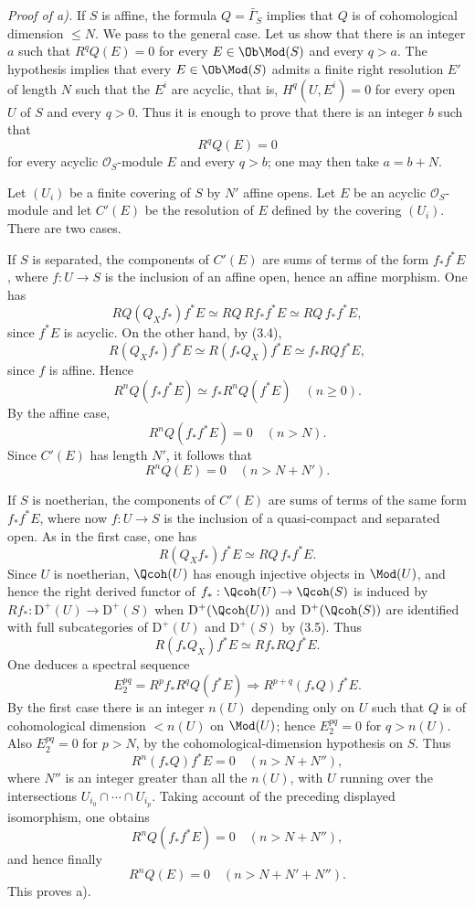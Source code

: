 \emph{Proof of a).} If $S$ is affine, the formula $Q=\widetilde{\Gamma_S}$ implies that $Q$ is of cohomological dimension $\leq N$. We pass to the general case. Let us show that there is an integer $a$ such that $R^qQ(E)=0$ for every $E\in\Ob\Mod(S)$ and every $q>a$. The hypothesis implies that every $E\in\Ob\Mod(S)$ admits a finite right resolution $E'$ of length $N$ such that the $E^i$ are acyclic, that is, $H^q(U,E^i)=0$ for every open $U$ of $S$ and every $q>0$. Thus it is enough to prove that there is an integer $b$ such that
\[
 R^qQ(E)=0
\]
for every acyclic $\mathcal O_S$-module $E$ and every $q>b$; one may then take $a=b+N$.

Let $(U_i)$ be a finite covering of $S$ by $N'$ affine opens. Let $E$ be an acyclic $\mathcal O_S$-module and let $C'(E)$ be the resolution of $E$ defined by the covering $(U_i)$. There are two cases.

If $S$ is separated, the components of $C'(E)$ are sums of terms of the form $f_*f^*E$, where $f:U\to S$ is the inclusion of an affine open, hence an affine morphism. One has
\[
 RQ(Q_Xf_*)f^*E\simeq RQ\,Rf_*f^*E\simeq RQ\,f_*f^*E,
\]
since $f^*E$ is acyclic. On the other hand, by (3.4),
\[
 R(Q_Xf_*)f^*E\simeq R(f_*Q_X)f^*E\simeq f_*RQf^*E,
\]
since $f$ is affine. Hence
\[
 R^nQ(f_*f^*E)\simeq f_*R^nQ(f^*E)\quad(n\geq0).
\]
By the affine case,
\[
 R^nQ(f_*f^*E)=0\quad(n>N).
\]
Since $C'(E)$ has length $N'$, it follows that
\[
 R^nQ(E)=0\quad(n>N+N').
\]

If $S$ is noetherian, the components of $C'(E)$ are sums of terms of the same form $f_*f^*E$, where now $f:U\to S$ is the inclusion of a quasi-compact and separated open. As in the first case, one has
\[
 R(Q_Xf_*)f^*E\simeq RQ\,f_*f^*E.
\]
Since $U$ is noetherian, $\Qcoh(U)$ has enough injective objects in $\Mod(U)$, and hence the right derived functor of $f_*:\Qcoh(U)\to\Qcoh(S)$ is induced by $Rf_*:\mathrm D^+(U)\to\mathrm D^+(S)$ when $\mathrm D^+(\Qcoh(U))$ and $\mathrm D^+(\Qcoh(S))$ are identified with full subcategories of $\mathrm D^+(U)$ and $\mathrm D^+(S)$ by (3.5). Thus
\[
 R(f_*Q_X)f^*E\simeq Rf_*RQf^*E.
\]
One deduces a spectral sequence
\[
 E_2^{pq}=R^pf_*R^qQ(f^*E)\Longrightarrow R^{p+q}(f_*Q)f^*E.
\]
By the first case there is an integer $n(U)$ depending only on $U$ such that $Q$ is of cohomological dimension $<n(U)$ on $\Mod(U)$; hence $E_2^{pq}=0$ for $q>n(U)$. Also $E_2^{pq}=0$ for $p>N$, by the cohomological-dimension hypothesis on $S$. Thus
\[
 R^n(f_*Q)f^*E=0\quad(n>N+N''),
\]
where $N''$ is an integer greater than all the $n(U)$, with $U$ running over the intersections $U_{i_0}\cap\cdots\cap U_{i_p}$. Taking account of the preceding displayed isomorphism, one obtains
\[
 R^nQ(f_*f^*E)=0\quad(n>N+N''),
\]
and hence finally
\[
 R^nQ(E)=0\quad(n>N+N'+N'').
\]
This proves a).

